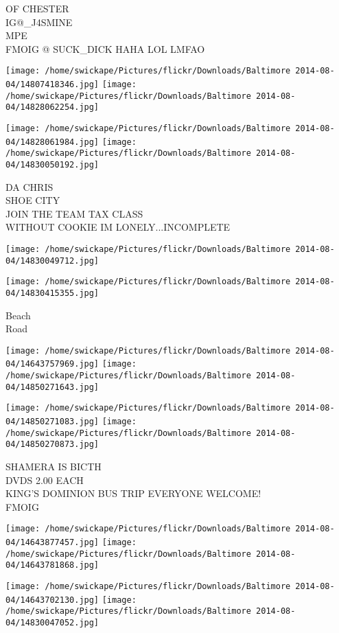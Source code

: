 \documentclass[10pt,letterpaper]{article}
\begin{document}
OF CHESTER\\
IG@\_J4SMINE\\
MPE\\
FMOIG @ SUCK\_DICK HAHA LOL LMFAO
\pagebreak

\texttt{[image: /home/swickape/Pictures/flickr/Downloads/Baltimore 2014-08-04/14807418346.jpg]}
\texttt{[image: /home/swickape/Pictures/flickr/Downloads/Baltimore 2014-08-04/14828062254.jpg]}

\texttt{[image: /home/swickape/Pictures/flickr/Downloads/Baltimore 2014-08-04/14828061984.jpg]}
\texttt{[image: /home/swickape/Pictures/flickr/Downloads/Baltimore 2014-08-04/14830050192.jpg]}

DA CHRIS\\
SHOE CITY\\
JOIN THE TEAM TAX CLASS\\
WITHOUT COOKIE IM LONELY...INCOMPLETE
\pagebreak

\texttt{[image: /home/swickape/Pictures/flickr/Downloads/Baltimore 2014-08-04/14830049712.jpg]}

\vspace{0.25in}
\texttt{[image: /home/swickape/Pictures/flickr/Downloads/Baltimore 2014-08-04/14830415355.jpg]}

Beach\\
Road
\pagebreak

\texttt{[image: /home/swickape/Pictures/flickr/Downloads/Baltimore 2014-08-04/14643757969.jpg]}
\texttt{[image: /home/swickape/Pictures/flickr/Downloads/Baltimore 2014-08-04/14850271643.jpg]}

\texttt{[image: /home/swickape/Pictures/flickr/Downloads/Baltimore 2014-08-04/14850271083.jpg]}
\texttt{[image: /home/swickape/Pictures/flickr/Downloads/Baltimore 2014-08-04/14850270873.jpg]}

SHAMERA IS BICTH\\
DVDS 2.00 EACH\\
KING'S DOMINION BUS TRIP EVERYONE WELCOME!\\
FMOIG
\pagebreak

\texttt{[image: /home/swickape/Pictures/flickr/Downloads/Baltimore 2014-08-04/14643877457.jpg]}
\texttt{[image: /home/swickape/Pictures/flickr/Downloads/Baltimore 2014-08-04/14643781868.jpg]}

\texttt{[image: /home/swickape/Pictures/flickr/Downloads/Baltimore 2014-08-04/14643702130.jpg]}
\texttt{[image: /home/swickape/Pictures/flickr/Downloads/Baltimore 2014-08-04/14830047052.jpg]}
\end{document}
